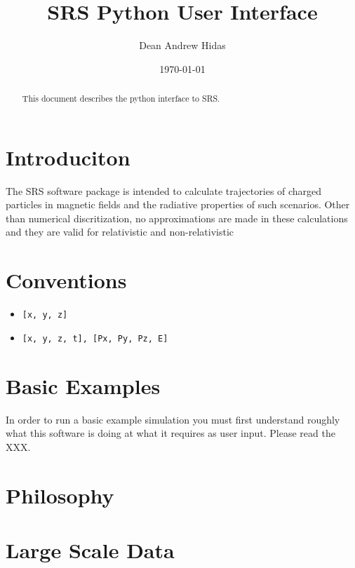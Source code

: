 \documentclass{article}
\title{SRS Python User Interface}
\author{Dean Andrew Hidas}
\date{\today}
\begin{document}
\maketitle

\begin{abstract}
This document describes the python interface to SRS.
\end{abstract}

\section{Introduciton}
The SRS software package is intended to calculate trajectories of charged particles in magnetic fields and the radiative properties of such scenarios.  Other than numerical discritization, no approximations are made in these calculations and they are valid for relativistic and non-relativistic


\section{Conventions}
\begin{itemize}
\item \begin{verbatim}[x, y, z]\end{verbatim}
\item \begin{verbatim}[x, y, z, t], [Px, Py, Pz, E]\end{verbatim}
\end{itemize}


\section{Basic Examples}
In order to run a basic example simulation you must first understand roughly what this software is doing at what it requires as user input.  Please read the XXX.


\section{Philosophy}


\section{Large Scale Data}
\end{document}
